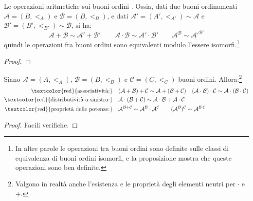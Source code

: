 \documentclass[11pt]{scrartcl}
\begin{document}
\begin{proposition}
	Le operazioni aritmetiche sui buoni ordini . Ossia, dati due buoni ordinamenti $\mathcal A = (B,<_A)$
	e $\mathcal B = (B,<_B)$, e dati $\mathcal A' = (A',<_{A'}) \sim \mathcal A$ e $\mathcal{B}' = (B',<_{B'}) \sim \mathcal B$, si ha:
	\[ \mathcal{A} + \mathcal{B} \sim \mathcal{A}' + \mathcal{B'} \qquad \mathcal{A} \cdot \mathcal{B} \sim \mathcal{A}' \cdot \mathcal{B'} \qquad \mathcal{A}^{\mathcal{B}} \sim \mathcal{A}'^{\mathcal{B'}}
		\]
	quindi le operazioni fra buoni ordini sono equivalenti modulo l'essere isomorfi.\footnote{In altre parole le operazioni tra buoni ordini sono definite sulle classi di equivalenza di buoni ordini isomorfi, e la proposizione mostra che queste 
	operazioni sono ben definite.}
\end{proposition}

\begin{proof}
	
\end{proof}

\begin{proposition}
	Siano $\mathcal{A} = (A,<_A)$, $\mathcal{B} = (B,<_B)$ e $\mathcal{C} = (C,<_C)$ buoni ordini. Allora:\footnote{Valgono in realtà anche l'esistenza e le proprietà degli elementi neutri per $\cdot$ e $+$.}
	\[\begin{split}
		\text{\textcolor{red}{associatività:}} &\quad (\mathcal A + \mathcal B) + \mathcal C \sim \mathcal A + (\mathcal B + \mathcal C) \quad (\mathcal A \cdot \mathcal B) \cdot \mathcal C \sim \mathcal A \cdot (\mathcal B \cdot \mathcal C)\\
		\text{\textcolor{red}{distributività a sinistra:}} &\quad  \mathcal A \cdot (\mathcal B + \mathcal C) \sim \mathcal A \cdot \mathcal B + \mathcal A \cdot \mathcal C \\
		\text{\textcolor{red}{proprietà delle potenze:}} &\quad {\mathcal A}^{\mathcal B + \mathcal C} \sim \mathcal A^{\mathcal B} \cdot {\mathcal A}^{\mathcal C} \qquad ({\mathcal A}^{\mathcal B})^{\mathcal{C}} \sim {\mathcal A}^{\mathcal B \cdot \mathcal C}
	\end{split}\]
\end{proposition}

\begin{proof}
	Facili verifiche.
\end{proof}
\end{document}
